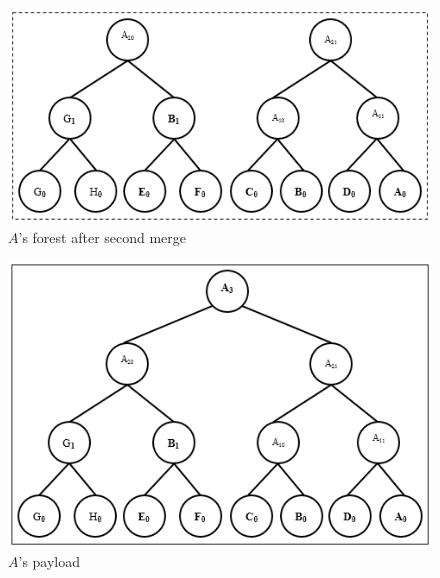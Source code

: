 \begin{exmp}
		\begin{figure}[h!]
			\centering
			\includegraphics[scale=1]{images/a-forest-second-merge.png}
			\caption{$A$'s forest after second merge}
			\label{fig:a-forest}
		\end{figure}

		\begin{figure}[h!]
			\centering
			\includegraphics[scale=1]{images/a-payload.png}
			\caption{$A$'s payload}
			\label{fig:a-payload}
		\end{figure}


\end{exmp}
